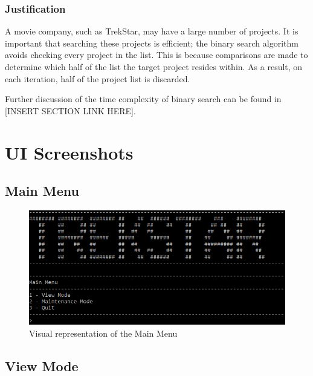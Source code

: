 \documentclass[
  english,
  a4paper,
,tablecaptionabove
]{scrartcl}
\begin{document}
\hypertarget{justification-1}{%
\subsubsection{Justification}\label{justification-1}}

A movie company, such as TrekStar, may have a large number of projects.
It is important that searching these projects is efficient; the binary
search algorithm avoids checking every project in the list. This is
because comparisons are made to determine which half of the list the
target project resides within. As a result, on each iteration, half of
the project list is discarded.

Further discussion of the time complexity of binary search can be found
in {[}INSERT SECTION LINK HERE{]}.

\newpage

\hypertarget{ui-screenshots}{%
\section{UI Screenshots}\label{ui-screenshots}}

\hypertarget{main-menu}{%
\subsection{Main Menu}\label{main-menu}}

\begin{figure}
\centering
\includegraphics{images/ui-screenshots/main-menu.png}
\caption{Visual representation of the Main Menu}
\end{figure}

\newpage

\hypertarget{view-mode}{%
\subsection{View Mode}\label{view-mode}}
\end{document}
